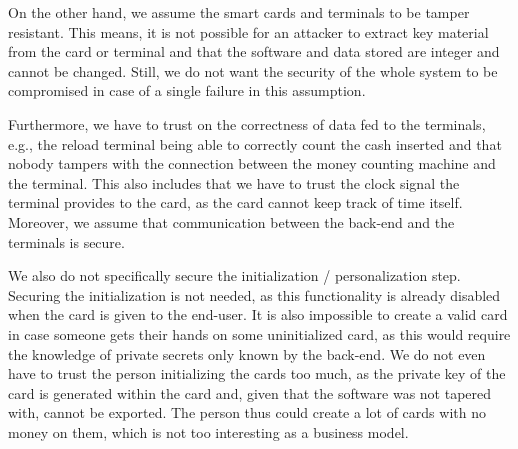 On the other hand, we assume the smart cards and terminals to be tamper resistant.
This means, it is not possible for an attacker to extract key material from the card or terminal and that the software and data stored are integer and cannot be changed.
Still, we do not want the security of the whole system to be compromised in case of a single failure in this assumption.

Furthermore, we have to trust on the correctness of data fed to the terminals, e.g., the reload terminal being able to correctly count the cash inserted and that nobody tampers with the connection between the money counting machine and the terminal.
This also includes that we have to trust the clock signal the terminal provides to the card, as the card cannot keep track of time itself.
Moreover, we assume that communication between the back-end and the terminals is secure.

We also do not specifically secure the initialization / personalization step.
Securing the initialization is not needed, as this functionality is already disabled when the card is given to the end-user.
It is also impossible to create a valid card in case someone gets their hands on some uninitialized card, as this would require the knowledge of private secrets only known by the back-end.
We do not even have to trust the person initializing the cards too much, as the private key of the card is generated within the card and, given that the software was not tapered with, cannot be exported.
The person thus could create a lot of cards with no money on them, which is not too interesting as a business model.



